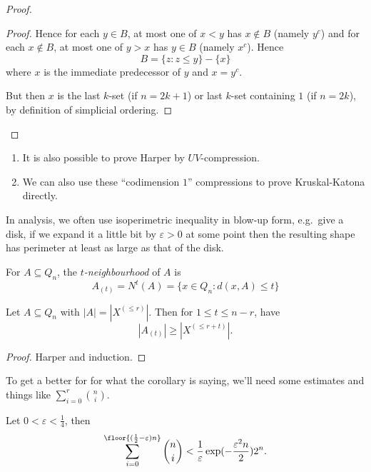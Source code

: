 \documentclass[a4paper]{article}
\begin{document}
\begin{proof}
\begin{proof}
    Hence for each \(y \in B\), at most one of \(x < y\) has \(x \notin B\) (namely \(y^c\)) and for each \(x \notin B\), at most one of \(y > x\) has \(y \in B\) (namely \(x^c\)). Hence
    \[
      B = \{z: z \leq y\} - \{x\}
    \]
    where \(x\) is the immediate predecessor of \(y\) and \(x = y^c\).

    But then \(x\) is the last \(k\)-set (if \(n = 2k + 1\)) or last \(k\)-set containing \(1\) (if \(n = 2k\)), by definition of simplicial ordering.
  \end{proof}
\end{proof}

\begin{remark}\leavevmode
  \begin{enumerate}
  \item It is also possible to prove Harper by \(UV\)-compression.
  \item We can also use these ``codimension \(1\)'' compressions to prove Kruskal-Katona directly.
  \end{enumerate}
\end{remark}

In analysis, we often use isoperimetric inequality in blow-up form, e.g.\ give a disk, if we expand it a little bit by \(\varepsilon > 0\) at some point then the resulting shape has perimeter at least as large as that of the disk.

\begin{definition}[\(t\)-neighbourhood]
  For \(A \subseteq Q_n\), the \emph{\(t\)-neighbourhood} of \(A\) is
  \[
    A_{(t)} = N^t(A) = \{x \in Q_n: d(x, A) \leq t\}
  \]
\end{definition}

\begin{corollary}
  Let \(A \subseteq Q_n\) with \(|A| = |X^{(\leq r)}|\). Then for \(1 \leq t \leq n - r\), have
  \[
    |A_{(t)}| \geq |X^{(\leq r + t)}|.
  \]
\end{corollary}

\begin{proof}
  Harper and induction.
\end{proof}

To get a better for for what the corollary is saying, we'll need some estimates and things like \(\sum_{i = 0}^r \binom{n}{i}\).

\begin{proposition}
  Let \(0 < \varepsilon < \frac{1}{4}\), then
  \[
    \sum_{i = 0}^{\floor{(\frac{1}{2} - \varepsilon) n}} \binom{n}{i} < \frac{1}{\varepsilon} \exp (- \frac{\varepsilon^2 n}{2}) 2^n.
  \]
\end{proposition}
\end{document}
